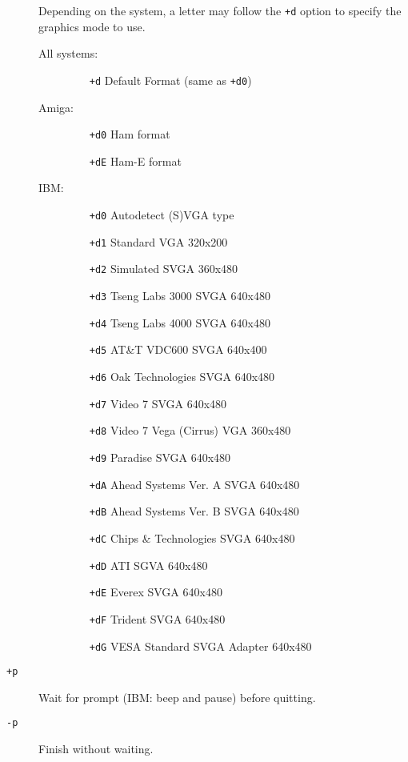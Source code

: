 \begin{description}
Depending on the system, a letter may follow the {\tt +d} option to specify
the graphics mode to use.
\begin{description}
\item[All systems:] \mbox{}
\begin{itemize}
\item[{\tt +d}] Default Format (same as {\tt +d0})
\end{itemize}
\item[Amiga:] \mbox{}
\begin{itemize}
\item[{\tt +d0}] Ham format
\item[{\tt +dE}] Ham-E format
\end{itemize}
\item[IBM:] \mbox{}
\begin{itemize}
\item[{\tt +d0}] Autodetect (S)VGA type
\item[{\tt +d1}] Standard VGA 320x200
\item[{\tt +d2}] Simulated SVGA 360x480
\item[{\tt +d3}] Tseng Labs 3000 SVGA 640x480
\item[{\tt +d4}] Tseng Labs 4000 SVGA 640x480
\item[{\tt +d5}] AT\&T VDC600 SVGA 640x400
\item[{\tt +d6}] Oak Technologies SVGA 640x480
\item[{\tt +d7}] Video 7 SVGA 640x480
\item[{\tt +d8}] Video 7 Vega (Cirrus) VGA 360x480
\item[{\tt +d9}] Paradise SVGA 640x480
\item[{\tt +dA}] Ahead Systems Ver. A SVGA 640x480
\item[{\tt +dB}] Ahead Systems Ver. B SVGA 640x480
\item[{\tt +dC}] Chips \& Technologies SVGA 640x480
\item[{\tt +dD}] ATI SGVA 640x480
\item[{\tt +dE}] Everex SVGA 640x480
\item[{\tt +dF}] Trident SVGA 640x480
\item[{\tt +dG}] VESA Standard SVGA Adapter 640x480
\end{itemize}
\end{description}

\item[{\tt +p}] Wait for prompt
(IBM: beep and pause) before quitting.
\noitemsep
\item[{\tt -p}] Finish without waiting.
\doitemsep


\end{description}
